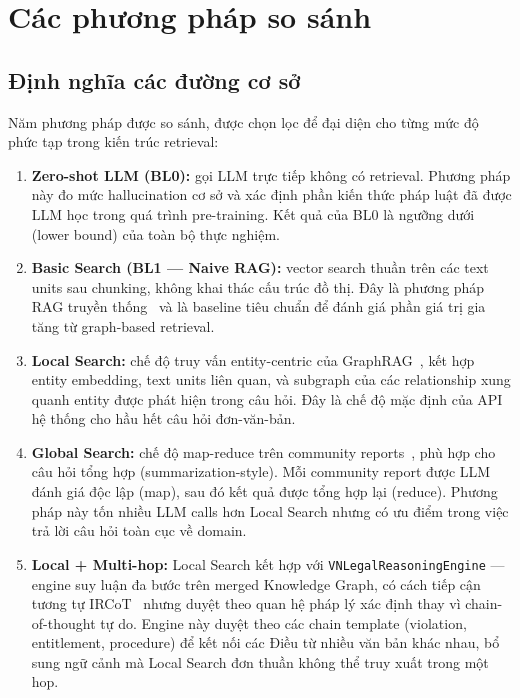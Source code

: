 \documentclass[../DoAn.tex]{subfiles}
\begin{document}
\section{Các phương pháp so sánh}
\label{section:4.3}

\subsection{Định nghĩa các đường cơ sở}
\label{subsection:4.3.1}

Năm phương pháp được so sánh, được chọn lọc để đại diện cho từng mức độ phức tạp trong kiến trúc retrieval:

\begin{enumerate}[nosep, leftmargin=*]
    \item \textbf{Zero-shot LLM (BL0):} gọi LLM trực tiếp không có retrieval. Phương pháp này đo mức hallucination cơ sở và xác định phần kiến thức pháp luật đã được LLM học trong quá trình pre-training. Kết quả của BL0 là ngưỡng dưới (lower bound) của toàn bộ thực nghiệm.

    \item \textbf{Basic Search (BL1 --- Naive RAG):} vector search thuần trên các text units sau chunking, không khai thác cấu trúc đồ thị. Đây là phương pháp RAG truyền thống~\cite{lewis2020rag} và là baseline tiêu chuẩn để đánh giá phần giá trị gia tăng từ graph-based retrieval.

    \item \textbf{Local Search:} chế độ truy vấn entity-centric của GraphRAG~\cite{graphrag2024}, kết hợp entity embedding, text units liên quan, và subgraph của các relationship xung quanh entity được phát hiện trong câu hỏi. Đây là chế độ mặc định của API hệ thống cho hầu hết câu hỏi đơn-văn-bản.

    \item \textbf{Global Search:} chế độ map-reduce trên community reports~\cite{graphrag2024}, phù hợp cho câu hỏi tổng hợp (summarization-style). Mỗi community report được LLM đánh giá độc lập (map), sau đó kết quả được tổng hợp lại (reduce). Phương pháp này tốn nhiều LLM calls hơn Local Search nhưng có ưu điểm trong việc trả lời câu hỏi toàn cục về domain.

    \item \textbf{Local + Multi-hop:} Local Search kết hợp với \texttt{VNLegalReasoningEngine} --- engine suy luận đa bước trên merged Knowledge Graph, có cách tiếp cận tương tự IRCoT~\cite{trivedi2022ircot} nhưng duyệt theo quan hệ pháp lý xác định thay vì chain-of-thought tự do. Engine này duyệt theo các chain template (violation, entitlement, procedure) để kết nối các Điều từ nhiều văn bản khác nhau, bổ sung ngữ cảnh mà Local Search đơn thuần không thể truy xuất trong một hop.
\end{enumerate}
\end{document}
